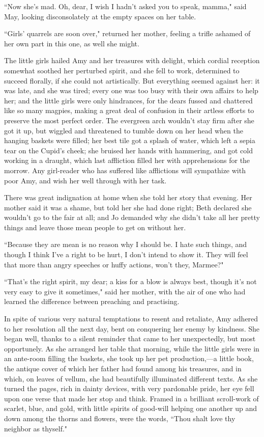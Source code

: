 ``Now she's mad. Oh, dear, I wish I
hadn't asked you to speak, mamma," said May, looking
disconsolately at the empty spaces on her table.

``Girls' quarrels are soon over," returned her mother,
feeling a trifle ashamed of her own part in this one, as well she might.

The little girls hailed Amy and her treasures with delight, which
cordial reception somewhat soothed her perturbed spirit, and she fell to
work, determined to succeed florally, if she could not artistically. But
everything seemed against her: it was late, and she was tired; every one
was too busy with their own affairs to help her; and the little girls
were only hindrances, for the dears fussed and chattered like so many
magpies, making a great deal of confusion in their artless efforts to
preserve the most perfect order. The evergreen arch
wouldn't stay firm after she got it up, but wiggled and
threatened to tumble down on her head when the hanging baskets were
filled; her best tile got a splash of water, which left a sepia tear on
the Cupid's cheek; she bruised her hands with hammering,
and got cold working in a draught, which last affliction filled her with
apprehensions for the morrow. Any girl-reader who has suffered like
afflictions will sympathize with poor Amy, and wish her well through
with her task.

There was great indignation at home when she told her story that
evening. Her mother said it was a shame, but told her she had done
right; Beth declared she wouldn't go to the fair at all;
and Jo demanded why she didn't take all her pretty
things and leave those mean people to get on without her.

``Because they are mean is no reason why I should be. I hate such things,
and though I think I've a right to be hurt, I
don't intend to show it. They will feel that more than
angry speeches or huffy actions, won't they, Marmee?"

``That's the right spirit, my dear; a kiss for a blow is
always best, though it's not very easy to give it
sometimes," said her mother, with the air of one who had learned the
difference between preaching and practising.

In spite of various very natural temptations to resent and retaliate,
Amy adhered to her resolution all the next day, bent on conquering her
enemy by kindness. She began well, thanks to a silent reminder that came
to her unexpectedly, but most opportunely. As she arranged her table
that morning, while the little girls were in an ante-room filling the
baskets, she took up her pet production,---a little book, the antique
cover of which her father had found among his treasures, and in which,
on leaves of vellum, she had beautifully illuminated different texts. As
she turned the pages, rich in dainty devices, with very pardonable
pride, her eye fell upon one verse that made her stop and think. Framed
in a brilliant scroll-work of scarlet, blue, and gold, with little
spirits of good-will helping one another up and down among the thorns
and flowers, were the words, ``Thou shalt love thy neighbor as thyself."

